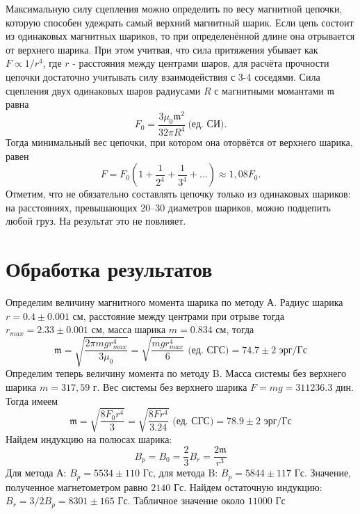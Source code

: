 \documentclass[a4paper, 12pt]{article}
\begin{document}
Максимальную силу сцепления можно определить по весу магнитной цепочки, 
которую способен удежрать самый верхний магнитный шарик. Если цепь состоит из одинаковых магнитных шариков, 
то при определенённой длине она отрывается от верхнего шарика. При этом учитвая, что сила притяжения убывает как 
$F \propto 1/r^4$, где $r$ - расстояния между центрами шаров, для расчёта прочности цепочки достаточно учитывать 
силу взаимодействия с 3-4 соседями.
Сила сцепления двух одинаковых шаров радиусами $R$ с магнитными момантами $\mathfrak{m}$ равна 
\begin{equation}
        F_0 = \frac{3 \mu_0 \mathfrak{m}^2}{32 \pi R^4}\  \text{(ед. СИ).}    
\end{equation}
Тогда минимальный вес цепочки, при котором она оторвётся от верхнего шарика, равен
\begin{equation}
    F = F_0\left(1 + \frac{1}{2^4} + \frac{1}{3^4} + ... \right) \approx 1,08F_0.
\end{equation}
Отметим, что не обязательно составлять цепочку только из одинаковых шариков: на расстояниях, превышающих 20–30 
диаметров шариков, можно подцепить любой груз. На результат это не повлияет.


\section{Обработка результатов}

Определим величину магнитного момента шарика по методу А. Радиус шарика $r = 0.4 \pm 0.001 \text{ см}$, расстояние между центрами при
отрыве тогда $r_{max} = 2.33\pm 0.001\text{ см}$, масса шарика $m = 0.834 \text{ см}$, тогда
\begin{equation}
    \mathfrak{m} = \sqrt{\frac{2\pi mgr^4_{max}}{3 \mu_0}} = \sqrt{\frac{mgr^4_{max}}{6}} \text{ (ед. СГС)} = 74.7 \pm 2 \text{ эрг/Гс}
\end{equation}
Определим теперь величину момента по методу B. Масса системы без верхнего шарика $m = 317,59 \text{ г}$. Вес системы без верхнего шарика $F = mg = 311236.3 \text{ дин}$.
Тогда имеем
\begin{equation}
	\mathfrak{m} = \sqrt{\frac{8 F_0 r^4}{3}} = \sqrt{\frac{8 F r^4}{3.24}} \text{ (ед. СГС)} = 78.9 \pm 2 \text{ эрг/Гс}
\end{equation}
Найдем индукцию на полюсах шарика:
\begin{equation}
	B_p = B_0 = \frac{2}{3} B_r = \frac{2 \mathfrak{m}}{r^3}
\end{equation}
Для метода А: $B_p = 5534 \pm 110 \text{ Гс}$, для метода B: $B_p = 5844 \pm 117\text{ Гс}$. Значение, полученное магнетометром равно $2140 
\text{ Гс}$. 
Найдем остаточную индукцию: $B_r = 3/2 B_p = 8301 \pm 165 \text{ Гс}$. Табличное значение около $11000 \text{ Гс}$
\end{document}
